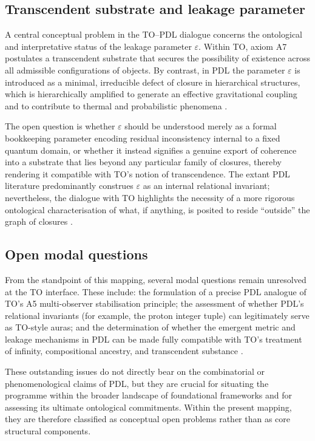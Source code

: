 \documentclass[11pt,a4paper]{article}
\begin{document}
\subsection{Transcendent substrate and leakage parameter}
\label{subsec:transcendent_leakage}

A central conceptual problem in the TO–PDL dialogue concerns the ontological and interpretative status of the leakage parameter \(\varepsilon\). Within TO, axiom A7 postulates a transcendent substrate that secures the possibility of existence across all admissible configurations of objects. By contrast, in PDL the parameter \(\varepsilon\) is introduced as a minimal, irreducible defect of closure in hierarchical structures, which is hierarchically amplified to generate an effective gravitational coupling and to contribute to thermal and probabilistic phenomena \citep{Exponent_18_PDL_2026,Coherence_Leakage_18_2026}.

The open question is whether \(\varepsilon\) should be understood merely as a formal bookkeeping parameter encoding residual inconsistency internal to a fixed quantum domain, or whether it instead signifies a genuine export of coherence into a substrate that lies beyond any particular family of closures, thereby rendering it compatible with TO’s notion of transcendence. The extant PDL literature predominantly construes \(\varepsilon\) as an internal relational invariant; nevertheless, the dialogue with TO highlights the necessity of a more rigorous ontological characterisation of what, if anything, is posited to reside “outside” the graph of closures \citep{PDL_TO_dialogue,PDL_position}.

\subsection{Open modal questions}
\label{subsec:modal_open}

From the standpoint of this mapping, several modal questions remain unresolved at the TO interface. These include: the formulation of a precise PDL analogue of TO’s A5 multi-observer stabilisation principle; the assessment of whether PDL’s relational invariants (for example, the proton integer tuple) can legitimately serve as TO-style auras; and the determination of whether the emergent metric and leakage mechanisms in PDL can be made fully compatible with TO’s treatment of infinity, compositional ancestry, and transcendent substance
\citep{PDL_TO_dialogue,PDL_position}.

These outstanding issues do not directly bear on the combinatorial or phenomenological claims of PDL, but they are crucial for situating the programme within the broader landscape of foundational frameworks and for assessing its ultimate ontological commitments. Within the present mapping, they are therefore classified as conceptual open problems rather than as core structural components.
\end{document}
